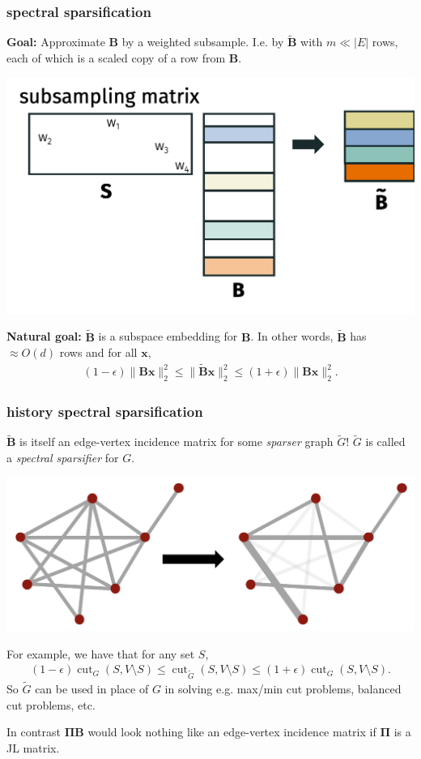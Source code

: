 \documentclass[compress]{beamer}
\newcommand{\bs}[1]{\boldsymbol{#1}}
\newcommand{\bv}[1]{\mathbf{#1}}
\DeclareMathOperator{\cut}{cut}
\begin{document}
\begin{frame}
	\frametitle{spectral sparsification}
	\textbf{Goal:} Approximate $\bv{B}$ by a weighted subsample. I.e. by $\tilde{\bv{B}}$ with $m \ll |E|$ rows, each of which is a scaled copy of a row from $\bv{B}$. 
	\begin{center}
		\includegraphics[width=.6\textwidth]{subsampled_b.png}
	\end{center}
	\textbf{Natural goal:} $\tilde{\bv{B}}$ is a subspace embedding for $\bv{B}$. In other words, $\tilde{\bv{B}}$ has $\approx O(d)$ rows and for all $\bv{x}$,
	\begin{align*}
		(1-\epsilon)\|\bv{B}\bv{x}\|_2^2 \leq \|\tilde{\bv{B}}\bv{x}\|_2^2 \leq (1+\epsilon)\|\bv{B}\bv{x}\|_2^2.
	\end{align*} 
\end{frame}

\begin{frame}
	\frametitle{history spectral sparsification}
	$\tilde{\bv{B}}$ is itself an edge-vertex incidence matrix for some 
	\emph{sparser} graph $\tilde{G}$!  $\tilde{G}$ is called a \emph{spectral sparsifier} for $G$.
	\vspace{-1em}
	
	\begin{center}
		\includegraphics[width=.6\textwidth]{sparsifier.png}
	\end{center}
	
	\vspace{-1em}
	For example, we have that for any set $S$, 
	\begin{align*}
		(1-\epsilon)\cut_{{G}}(S,V\setminus S) \leq \cut_{\tilde{G}}(S,V\setminus S) \leq (1+\epsilon)\cut_{{G}}(S,V\setminus S).
	\end{align*}
	So $\tilde{G}$ can be used in place of $G$ in solving e.g. max/min cut problems, balanced cut problems, etc. 
	
	\vspace{-1em}
	\begin{center}
		\alert{In contrast $\bs{\Pi} \bv{B}$ would look nothing like an edge-vertex incidence matrix if $\bs{\Pi}$ is a JL matrix. }
	\end{center}
\end{frame}
\end{document}
